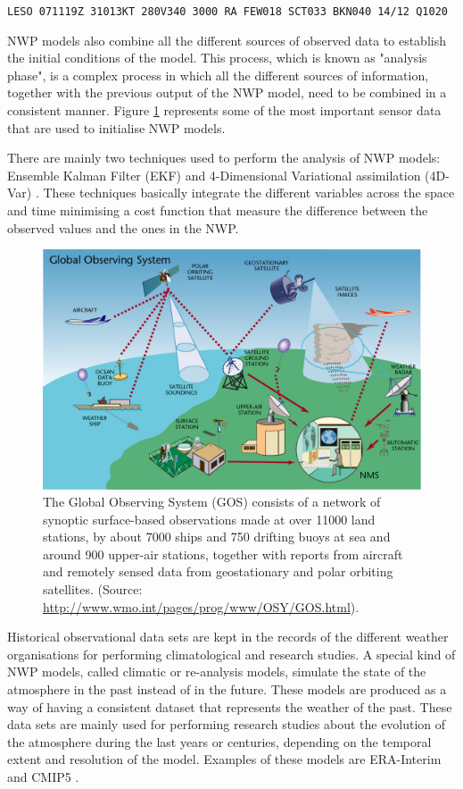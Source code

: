 \texttt{LESO 071119Z 31013KT 280V340 3000 RA FEW018 SCT033 BKN040 14/12 Q1020}

\medskip

NWP models also combine all the different sources of observed data to establish the initial conditions of the model. This process, which is known as "analysis phase", is a complex process in which all the different sources of information, together with the previous output of the NWP model, need to be combined in a consistent manner. Figure \ref{gos_wmo} represents some of the most important sensor data that are used to initialise NWP models.

\medskip

There are mainly two techniques used to perform the analysis of NWP models: Ensemble Kalman Filter (EKF) \citep{burgers1998analysis} and 4-Dimensional Variational assimilation (4D-Var) \citep{courtier1994strategy}. These techniques basically integrate the different variables across the space and time minimising a cost function that measure the difference between the observed values and the ones in the NWP.

\medskip

\begin{figure}[h]
	\centerline{\includegraphics[width=12cm]{GOS-fullsize.jpg}} \caption{ The Global Observing System (GOS) consists of a network of synoptic surface-based observations made at over 11000 land stations, by about 7000 ships and 750 drifting buoys at sea and around 900 upper-air stations, together with reports from aircraft and remotely sensed data from geostationary and polar orbiting satellites. (Source: \url{http://www.wmo.int/pages/prog/www/OSY/GOS.html}).}\label{gos_wmo}
\end{figure}

Historical observational data sets are kept in the records of the different weather organisations for performing climatological and research studies. A special kind of NWP models, called climatic or re-analysis models, simulate the state of the atmosphere in the past instead of in the future. These models are produced as a way of having a consistent dataset that represents the weather of the past. These data sets are mainly used for performing research studies about the evolution of the atmosphere during the last years or centuries, depending on the temporal extent and resolution of the model. Examples of these models are ERA-Interim \citep{dee2011era} and CMIP5 \citep{taylor2012overview}.  

